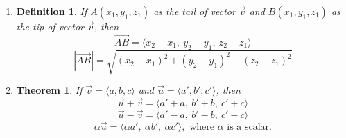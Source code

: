 \documentclass[12pt,a4paper]{article}
\newtheorem{thm}{Theorem}[subsection]
\newtheorem{df}{Definition}[subsection]
\def\vecv{\vec{v}}
\def\vecu{\vec{u}}
\begin{document}
\begin{enumerate}
\begin{center}
	\end{center}
	\item \begin{df} If $A(x_1,y_1,z_1)$ as the tail of vector $\vecv$ and $B(x_1,y_1,z_1)$ as the tip of vector $\vecv$, then \[\overrightarrow{AB}=\langle x_2-x_1,\ y_2-y_1,\ z_2-z_1\rangle\]\[|\overrightarrow{AB}|=\sqrt{(x_2-x_1)^2+(y_2-y_1)^2+(z_2-z_1)^2}\]\end{df}
	\item \begin{thm}If $\vecv=\langle a,b,c\rangle$ and $\vecu=\langle a',b',c'\rangle$, then \[\vecu+\vecv=\langle a'+a,\ b'+b,\ c'+c\rangle\]\[\vecu-\vecv=\langle a'-a,\ b'-b,\ c'-c\rangle\]\[\alpha\vecu=\langle\alpha a',\ \alpha b',\ \alpha c'\rangle,\text{ where }\alpha\text{ is a scalar.}\]\end{thm}
\end{enumerate}
\end{document}
